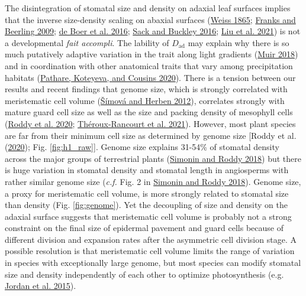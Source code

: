 \documentclass[
  12pt,
]{article}
\begin{document}
The disintegration of stomatal size and density on adaxial leaf surfaces implies that the inverse size-density scaling on abaxial surfaces (\protect\hyperlink{ref-weiss_untersuchungen_1865}{Weiss 1865}; \protect\hyperlink{ref-franks_maximum_2009}{Franks and Beerling 2009}; \protect\hyperlink{ref-de_boer_optimal_2016}{de Boer et al. 2016}; \protect\hyperlink{ref-sack_developmental_2016}{Sack and Buckley 2016}; \protect\hyperlink{ref-liu_scaling_2021}{Liu et al. 2021}) is not a developmental \emph{fait accompli}. The lability of \(D_\text{ad}\) may explain why there is so much putatively adaptive variation in the trait along light gradients (\protect\hyperlink{ref-muir_light_2018}{Muir 2018}) and in coordination with other anatomical traits that vary among precipitation habitats (\protect\hyperlink{ref-pathare_increased_2020}{Pathare, Koteyeva, and Cousins 2020}). There is a tension between our results and recent findings that genome size, which is strongly correlated with meristematic cell volume (\protect\hyperlink{ref-simova_geometrical_2012}{Šímová and Herben 2012}), correlates strongly with mature guard cell size as well as the size and packing density of mesophyll cells (\protect\hyperlink{ref-roddy_scaling_2020}{Roddy et al. 2020}; \protect\hyperlink{ref-theroux-rancourt_maximum_2021}{Théroux-Rancourt et al. 2021}). However, most plant species are far from their minimum cell size as determined by genome size {[}Roddy et al. (\protect\hyperlink{ref-roddy_scaling_2020}{2020}); Fig. \ref{fig:h1_raw}{]}. Genome size explains 31-54\% of stomatal density across the major groups of terrestrial plants (\protect\hyperlink{ref-simonin_genome_2018}{Simonin and Roddy 2018}) but there is huge variation in stomatal density and stomatal length in angiosperms with rather similar genome size (\emph{c.f.} Fig. 2 in \protect\hyperlink{ref-simonin_genome_2018}{Simonin and Roddy 2018}). Genome size, a proxy for meristematic cell volume, is more strongly related to stomatal size than density (Fig. \ref{fig:genome}). Yet the decoupling of size and density on the adaxial surface suggests that meristematic cell volume is probably not a strong constraint on the final size of epidermal pavement and guard cells because of different division and expansion rates after the asymmetric cell division stage. A possible resolution is that meristematic cell volume limits the range of variation in species with exceptionally large genome, but most species can modify stomatal size and density independently of each other to optimize photosynthesis (e.g. \protect\hyperlink{ref-jordan_environmental_2015}{Jordan et al. 2015}).
\end{document}

